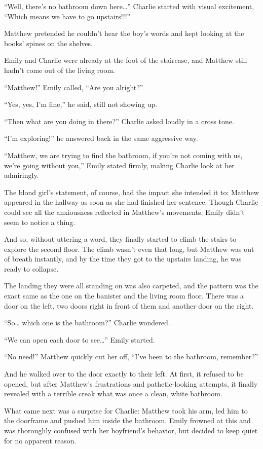 “Well, there's no bathroom down here…” Charlie started with visual excitement, “Which means we have to go upstairs!!!”

Matthew pretended he couldn't hear the boy's words and kept looking at the books' spines on the shelves.

Emily and Charlie were already at the foot of the staircase, and Matthew still hadn't come out of the living room.

“Matthew!” Emily called, “Are you alright?”

“Yes, yes, I'm fine,” he said, still not showing up.

“Then what are you doing in there?” Charlie asked loudly in a cross tone.

“I'm exploring!” he answered back in the same aggressive way.

“Matthew, we are trying to find the bathroom, if you're not coming with us, we're going without you,” Emily stated firmly, making Charlie look at her admiringly.

The blond girl's statement, of course, had the impact she intended it to: Matthew appeared in the hallway as soon as she had finished her sentence. Though Charlie could see all the anxiousness reflected in Matthew's movements, Emily didn't seem to notice a thing.

And so, without uttering a word, they finally started to climb the stairs to explore the second floor. The climb wasn't even that long, but Matthew was out of breath instantly, and by the time they got to the upstairs landing, he was ready to collapse.

The landing they were all standing on was also carpeted, and the pattern was the exact same as the one on the banister and the living room floor. There was a door on the left, two doors right in front of them and another door on the right.

“So… which one is the bathroom?” Charlie wondered.

“We can open each door to see…” Emily started.

“No need!” Matthew quickly cut her off, “I've been to the bathroom, remember?”

And he walked over to the door exactly to their left. At first, it refused to be opened, but after Matthew's frustrations and pathetic-looking attempts, it finally revealed with a terrible creak what was once a clean, white bathroom.

What came next was a surprise for Charlie: Matthew took his arm, led him to the doorframe and pushed him inside the bathroom. Emily frowned at this and was thoroughly confused with her boyfriend's behavior, but decided to keep quiet for no apparent reason.

